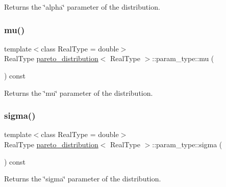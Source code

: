 Returns the \char`\"{}alpha\char`\"{} parameter of the distribution. 

\mbox{\label{classpareto__distribution_1_1param__type_a04e73cd088de22acbf0f89fdc64ffac3}} 
\subsubsection{\texorpdfstring{mu()}{mu()}}
{\footnotesize\ttfamily template$<$class Real\+Type  = double$>$ \\
Real\+Type \mbox{\hyperlink{classpareto__distribution}{pareto\+\_\+distribution}}$<$ Real\+Type $>$\+::param\+\_\+type\+::mu (\begin{DoxyParamCaption}{ }\end{DoxyParamCaption}) const\hspace{0.3cm}{\ttfamily [inline]}}



Returns the \char`\"{}mu\char`\"{} parameter of the distribution. 

\mbox{\label{classpareto__distribution_1_1param__type_ac115308c4703af0f20c0e3dba77ae3cb}} 
\subsubsection{\texorpdfstring{sigma()}{sigma()}}
{\footnotesize\ttfamily template$<$class Real\+Type  = double$>$ \\
Real\+Type \mbox{\hyperlink{classpareto__distribution}{pareto\+\_\+distribution}}$<$ Real\+Type $>$\+::param\+\_\+type\+::sigma (\begin{DoxyParamCaption}{ }\end{DoxyParamCaption}) const\hspace{0.3cm}{\ttfamily [inline]}}



Returns the \char`\"{}sigma\char`\"{} parameter of the distribution. 



